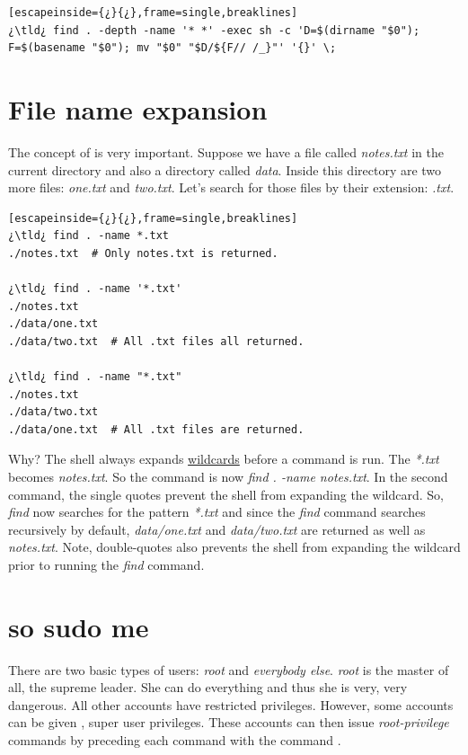 
\begin{lstlisting}[escapeinside={¿}{¿},frame=single,breaklines]
¿\tld¿ find . -depth -name '* *' -exec sh -c 'D=$(dirname "$0"); F=$(basename "$0"); mv "$0" "$D/${F// /_}"' '{}' \;
\end{lstlisting}

	
\section{File name expansion}

The concept of  is very important. Suppose we have a file called \textsl{notes.txt} in the current directory and also a directory called \textsl{data}. Inside this directory are two more files: \textsl{one.txt} and \textsl{two.txt}. Let's search for those files by their extension: \textsl{.txt}.

\begin{lstlisting}[escapeinside={¿}{¿},frame=single,breaklines]
¿\tld¿ find . -name *.txt
./notes.txt  # Only notes.txt is returned.

¿\tld¿ find . -name '*.txt'
./notes.txt 
./data/one.txt
./data/two.txt	# All .txt files all returned.

¿\tld¿ find . -name "*.txt"
./notes.txt
./data/two.txt
./data/one.txt  # All .txt files are returned.
\end{lstlisting}

Why? The shell always expands \href{http://tldp.org/LDP/GNU-Linux-Tools-Summary/html/x11655.htm}{wildcards} before a command is run. The \textsl{*.txt} becomes \textsl{notes.txt}. So the command is now \emph{find . -name notes.txt}. In the second command, the single quotes prevent the shell from expanding the wildcard. So, \emph{find} now searches for the pattern \textsl{*.txt} and since the \emph{find} command searches recursively by default, \textsl{data/one.txt} and \textsl{data/two.txt} are returned as well as \textsl{notes.txt}. Note, double-quotes also prevents the shell from expanding the wildcard prior to running the \emph{find} command.

\section{so sudo me}\label{sec:sudo}

There are two basic types of users: \emph{root} and \emph{everybody else}. \emph{root} is the master of all, the supreme leader. She can do everything and thus she is very, very dangerous. All other accounts have restricted privileges. However, some accounts can be given , super user privileges. These accounts can then issue \emph{root-privilege} commands by preceding each command with the command .

